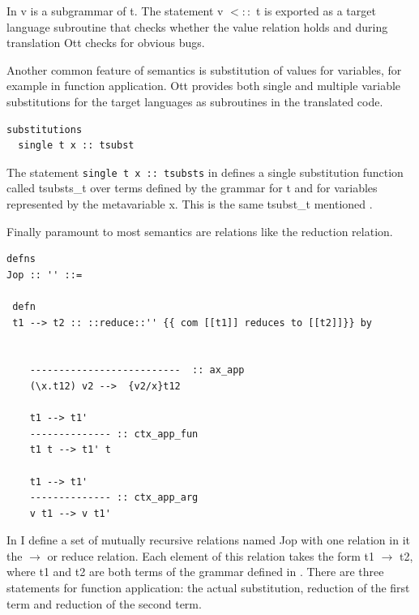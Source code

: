 \documentclass[12pt,twoside,notitlepage]{report}
\theoremstyle{plain}%
\theoremstyle{definition}
\theoremstyle{remark}
\begin{document}
In  v is a subgrammar of t. The statement v $<::$ t is exported as a target language subroutine that checks whether the value relation holds and during translation Ott checks for obvious bugs.

Another common feature of semantics is substitution of values for variables, for example in function application. Ott provides both single and multiple variable substitutions for the target languages as subroutines in the translated code.


\vspace{3mm}

\begin{minipage}{\linewidth}

\begin{lstlisting}[language={Ott}, caption={Ott substitution example}, label={lst:ottsubstex}]
substitutions
  single t x :: tsubst 
\end{lstlisting}

\end{minipage}


The statement \lstinline[language={Ott}]|single t x :: tsubsts| in  defines a single substitution function called tsubsts\_t over terms defined by the grammar for t and for variables represented by the metavariable x. This is the same tsubst\_t mentioned .



Finally paramount to most semantics are relations like the reduction relation.


\begin{minipage}{\linewidth}
\begin{lstlisting}[language={Ott}, caption={Ott reduction relation example}, label={lst:ottredex}]
defns
Jop :: '' ::=

 defn
 t1 --> t2 :: ::reduce::'' {{ com [[t1]] reduces to [[t2]]}} by


    --------------------------  :: ax_app
    (\x.t12) v2 -->  {v2/x}t12

    t1 --> t1'
    -------------- :: ctx_app_fun
    t1 t --> t1' t

    t1 --> t1'
    -------------- :: ctx_app_arg
    v t1 --> v t1'
\end{lstlisting}
\end{minipage}

In  I define a set of mutually recursive relations named Jop with one relation in it the $\longrightarrow$ or reduce relation. Each element of this relation takes the form t1 $\longrightarrow$ t2, where t1 and t2 are both terms of the grammar defined in . There are three statements for function application: the actual substitution, reduction of the first term and reduction of the second term. 
\end{document}
